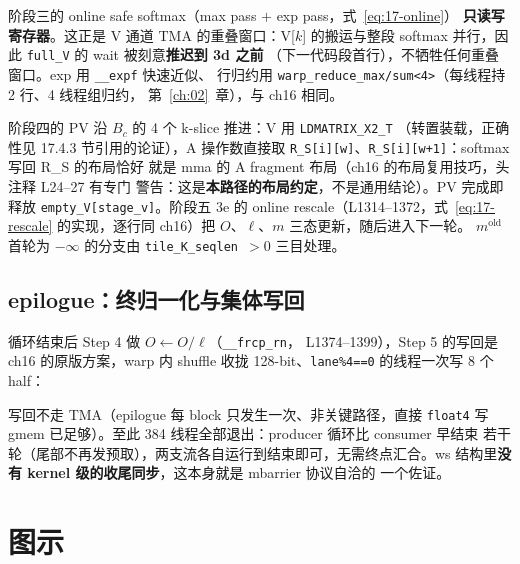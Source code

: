 阶段三的 online safe softmax（max pass $+$ exp pass，式~\ref{eq:17-online}）
\textbf{只读写寄存器}。这正是 V 通道 TMA 的重叠窗口：V[$k$] 的搬运与整段
softmax 并行，因此 \texttt{full\_V} 的 wait 被刻意\textbf{推迟到 3d 之前}
（下一代码段首行），不牺牲任何重叠窗口。exp 用 \texttt{\_\_expf} 快速近似、
行归约用 \texttt{warp\_\allowbreak{}reduce\_\allowbreak{}max/\allowbreak{}sum\allowbreak{}<4>}（每线程持 2 行、4 线程组归约，
第~\ref{ch:02}~章），与 ch16 相同。



阶段四的 PV 沿 $B_c$ 的 4 个 k-slice 推进：V 用 \texttt{LDMATRIX\_\allowbreak{}X2\_\allowbreak{}T}
（转置装载，正确性见 17.4.3 节引用的论证），A 操作数直接取
\texttt{R\_S[i][w]}、\texttt{R\_S[i][w+1]}：softmax 写回 R\_S 的布局恰好
就是 mma 的 A fragment 布局（ch16 的布局复用技巧，头注释 L24--27 有专门
警告：这是\textbf{本路径的布局约定}，不是通用结论）。PV 完成即释放
\texttt{empty\_\allowbreak{}V[stage\_\allowbreak{}v]}。阶段五 3e 的 online rescale（L1314--1372，式~\ref{eq:17-rescale}
的实现，逐行同 ch16）把 $O$、$\ell$、$m$ 三态更新，随后进入下一轮。
$m^{\text{old}}$ 首轮为 $-\infty$ 的分支由 \texttt{tile\_\allowbreak{}K\_\allowbreak{}seqlen $> 0$}
三目处理。

\subsection{epilogue：终归一化与集体写回}

循环结束后 Step 4 做 $O \leftarrow O / \ell$（\texttt{\_\_frcp\_rn}，
L1374--1399），Step 5 的写回是 ch16 的原版方案，warp 内 shuffle 收拢
128-bit、\texttt{lane\%4==0} 的线程一次写 8 个 half：



写回不走 TMA（epilogue 每 block 只发生一次、非关键路径，直接 \texttt{float4}
写 gmem 已足够）。至此 384 线程全部退出：producer 循环比 consumer 早结束
若干轮（尾部不再发预取），两支流各自运行到结束即可，无需终点汇合。ws
结构里\textbf{没有 kernel 级的收尾同步}，这本身就是 mbarrier 协议自洽的
一个佐证。

\needspace{120mm}

\section{图示}


